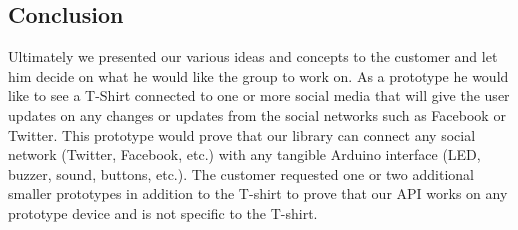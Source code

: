 \subsection{Conclusion}
Ultimately we presented our various ideas and concepts to the customer and let him decide on what he would
like the group to work on. As a prototype he would like to see a T-Shirt connected to one or more social media
that will give the user updates on any changes or updates from the social networks such as Facebook or Twitter.
This prototype would prove that our library can connect any social network (Twitter, Facebook, etc.) with any
tangible Arduino interface (LED, buzzer, sound, buttons, etc.). The customer requested one or two additional
smaller prototypes in addition to the T-shirt to prove that our API works on any prototype device and is not
specific to the T-shirt.
